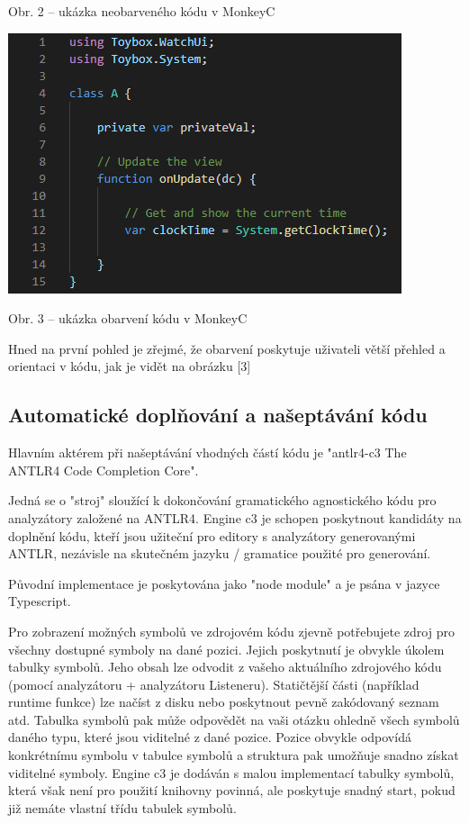 \documentclass[czech,master,dept460,male,cpp,cpdeclaration]{diploma}
\begin{document}
	Obr. 2 – ukázka neobarveného kódu v MonkeyC

\includegraphics[]{colored_code}

	Obr. 3 – ukázka obarvení kódu v MonkeyC
	
Hned na první pohled je zřejmé, že obarvení poskytuje uživateli větší přehled a orientaci v kódu, jak je vidět na obrázku [3]

\subsection{Automatické doplňování a našeptávání kódu}

Hlavním aktérem při našeptávání vhodných částí kódu je "antlr4-c3 The ANTLR4 Code Completion Core".

Jedná se o "stroj" sloužící k dokončování gramatického agnostického kódu pro analyzátory založené na ANTLR4. Engine c3 je schopen poskytnout kandidáty na doplnění kódu, kteří jsou užiteční pro editory s analyzátory generovanými ANTLR, nezávisle na skutečném jazyku / gramatice použité pro generování.

Původní implementace je poskytována jako "node module" a je psána v jazyce Typescript.

Pro zobrazení možných symbolů ve zdrojovém kódu zjevně potřebujete zdroj pro všechny dostupné symboly na dané pozici. Jejich poskytnutí je obvykle úkolem tabulky symbolů. Jeho obsah lze odvodit z vašeho aktuálního zdrojového kódu (pomocí analyzátoru + analyzátoru Listeneru). Statičtější části (například runtime funkce) lze načíst z disku nebo poskytnout pevně zakódovaný seznam atd. Tabulka symbolů pak může odpovědět na vaši otázku ohledně všech symbolů daného typu, které jsou viditelné z dané pozice. Pozice obvykle odpovídá konkrétnímu symbolu v tabulce symbolů a struktura pak umožňuje snadno získat viditelné symboly. Engine c3 je dodáván s malou implementací tabulky symbolů, která však není pro použití knihovny povinná, ale poskytuje snadný start, pokud již nemáte vlastní třídu tabulek symbolů.
\end{document}
